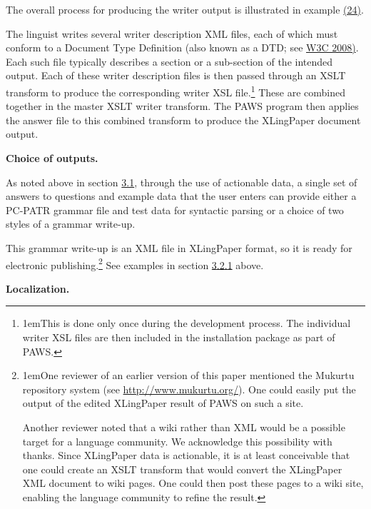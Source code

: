 \documentclass[12pt]{article}
\begin{document}
The overall process for producing the writer output is illustrated in example \hyperlink{xWriterToOutput}{(24)}.\par{}{\vspace{12pt}\raggedright{}
\vspace{12pt}}\noindent The linguist writes several writer description XML files, each of which must conform to a Document Type Definition (also known as a DTD; see \hyperlink{rW3CDTD}{W3C  2008)}. Each such file typically describes a section or a sub-section of the intended output. Each of these writer description files is then passed through an XSLT transform to produce the corresponding writer XSL file.\protect\footnote[10]{{\parindent1em\protect\hypertarget{nWriterToXSLDoneOnce}{}This is done only once during the development process. The individual writer XSL files are then included in the installation package as part of {PAWS}.}} These are combined together in the master XSLT writer transform. The PAWS program then applies the answer file to this combined transform to produce the XLingPaper document output.\par{}\vspace{.25in}\noindent\protect\hypertarget{sOutputs}{{\noindent
\textbf{{ }}}}{\noindent
\textbf{{\protect\noindent
Choice of outputs. }}}
As noted above in section \hyperlink{sPages}{3.1}, through the use of actionable data, a single set of answers to questions and example data that the user enters can provide either a PC-PATR grammar file and test data for syntactic parsing or a choice of two styles of a grammar write-up.\par{}\indent This grammar write-up is an XML file in {XLingPaper} format, so it is ready for electronic publishing.\protect\footnote[11]{{\parindent1em\protect\hypertarget{nMukurtu}{}One reviewer of an earlier version of this paper mentioned the Mukurtu repository system (see \href{http://www.mukurtu.org/}{http://www.mukurtu.org/}). One could easily put the output of the edited {XLingPaper} result of {PAWS} on such a site.\par{}Another reviewer noted that a wiki rather than XML would be a possible target for a language community. We acknowledge this possibility with thanks. Since {XLingPaper} data is actionable, it is at least conceivable that one could create an XSLT transform that would convert the {XLingPaper} XML document to wiki pages. One could then post these pages to a wiki site, enabling the language community to refine the result.}} See examples in section \hyperlink{sXLingPaper}{3.2.1} above.\par{}\vspace{.25in}\noindent\protect\hypertarget{sLocal}{{\noindent
\textbf{{ }}}}{\noindent
\textbf{{\protect\noindent
Localization. }}}
\end{document}
